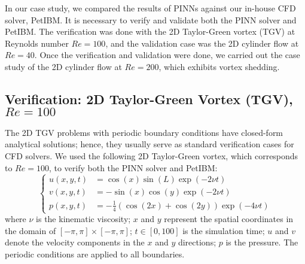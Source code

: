 
In our case study, we compared the results of PINNs against our in-house CFD solver, PetIBM.
It is necessary to verify and validate both the PINN solver and PetIBM.
The verification was done with the 2D Taylor-Green vortex (TGV) at Reynolds number $Re=\num{100}$, and the validation case was the 2D cylinder flow at $Re=40$.
Once the verification and validation were done, we carried out the case study of the 2D cylinder flow at $Re=\num{200}$, which exhibits vortex shedding.

\subsection{Verification: 2D Taylor-Green Vortex (TGV), $Re=\num{100}$}

The 2D TGV problems with periodic boundary conditions have closed-form analytical solutions; hence, they usually serve as standard verification cases for CFD solvers. 
We used the following 2D Taylor-Green vortex, which corresponds to $Re=\num{100}$, to verify both the PINN solver and PetIBM:
\begin{equation}\label{eq:tgv}
    \left\{
        \begin{aligned}
            u(x, y, t) &= \cos(x)\sin(L)\exp(-2 \nu t) \\
            v(x, y, t) &= - \sin(x)\cos(y)\exp(-2 \nu t) \\
            p(x, y, t) &= -\frac{1}{4}\left(\cos(2x) + \cos(2y)\right)\exp(-4 \nu t)
        \end{aligned}
    \right.
\end{equation}
where $\nu$ is the kinematic viscosity;
$x$ and $y$ represent the spatial coordinates in the domain of $\left[-\pi, \pi\right]\times\left[-\pi, \pi\right]$;
$t \in [0, 100]$ is the simulation time;
$u$ and $v$ denote the velocity components in the $x$ and $y$ directions;
$p$ is the pressure.
The periodic conditions are applied to all boundaries.

